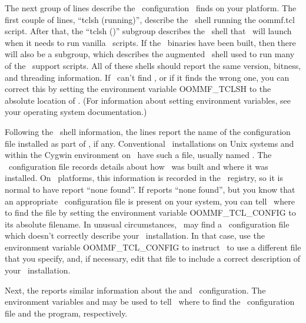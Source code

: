 The next group of lines describe the \Tcl\ configuration \OOMMF\ finds
on your platform.  The first couple of lines, ``tclsh (running)'',
describe the \Tcl\ shell running the oommf.tcl script.  After that, the
``tclsh (\OOMMF)'' subgroup describes the \Tcl\ shell that \OOMMF\ will
launch when it needs to run vanilla \Tcl\ scripts.  If the \OOMMF\ binaries
have been built, then there will also be a  subgroup, which
describes the augmented \Tcl\ shell used to run many of the
\OOMMF\ support scripts.  All of these shells should report the same
version, bitness, and threading information.  If \OOMMF\ can't find
, or if it finds the wrong one, you can correct this by
setting the environment variable
OOMMF\_TCLSH to the absolute
location of .  (For information about setting environment
variables, see your operating system documentation.)

Following the \Tcl\ shell information, the  lines
report the name of the configuration file installed as part of \Tcl, if
any.  Conventional \Tcl\ installations on Unix systems and within the
Cygwin environment on
\Windows\ have such a file, usually named .  The
\Tcl\ configuration file records details about how \Tcl\ was built and
where it was installed.  On \Windows\ platforms, this information is
recorded in the
\Windows\ registry, so
it is normal to have  report ``none found''.  If
 reports ``none found'', but you know that an
appropriate \Tcl\ configuration file is present on your system, you can
tell \OOMMF\ where to find the file by setting the environment variable
OOMMF\_TCL\_CONFIG to
its absolute filename.  In unusual circumstances, \OOMMF\ may find a
\Tcl\ configuration file which doesn't correctly describe your
\Tcl\ installation.  In that case, use the environment variable
OOMMF\_TCL\_CONFIG to instruct \OOMMF\ to use a different file that you
specify, and, if necessary, edit that file to include a correct
description of your \Tcl\ installation.

Next, the  reports similar information about the
 and \Tk\ configuration.  The environment variables
and  may be
used to tell \OOMMF\ where to find the \Tk\ configuration file and the
 program, respectively.

